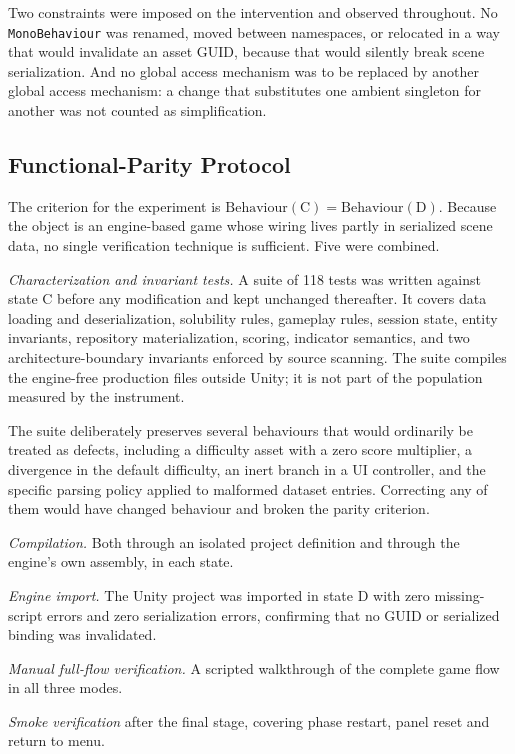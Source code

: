 \documentclass{sbc2019}%
\begin{document}
Two constraints were imposed on the intervention and observed throughout. No
\texttt{MonoBehaviour} was renamed, moved between namespaces, or relocated in a
way that would invalidate an asset GUID, because that would silently break
scene serialization. And no global access mechanism was to be replaced by
another global access mechanism: a change that substitutes one ambient
singleton for another was not counted as simplification.

\subsection{Functional-Parity Protocol}

The criterion for the experiment is $\mathrm{Behaviour}(\text{C}) =
\mathrm{Behaviour}(\text{D})$. Because the object is an engine-based game whose
wiring lives partly in serialized scene data, no single verification technique
is sufficient. Five were combined.

\emph{Characterization and invariant tests.} A suite of 118 tests was written
against state C before any modification and kept unchanged thereafter. It
covers data loading and deserialization, solubility rules, gameplay rules,
session state, entity invariants, repository materialization, scoring, indicator
semantics, and two architecture-boundary invariants enforced by source scanning.
The suite compiles the engine-free production files outside Unity; it is not
part of the population measured by the instrument.

The suite deliberately preserves several behaviours that would ordinarily be
treated as defects, including a difficulty asset with a zero score multiplier,
a divergence in the default difficulty, an inert branch in a UI controller, and
the specific parsing policy applied to malformed dataset entries. Correcting any
of them would have changed behaviour and broken the parity criterion.

\emph{Compilation.} Both through an isolated project definition and through the
engine's own assembly, in each state.

\emph{Engine import.} The Unity project was imported in state D with zero
missing-script errors and zero serialization errors, confirming that no GUID or
serialized binding was invalidated.

\emph{Manual full-flow verification.} A scripted walkthrough of the complete
game flow in all three modes.

\emph{Smoke verification} after the final stage, covering phase restart, panel
reset and return to menu.
\end{document}
